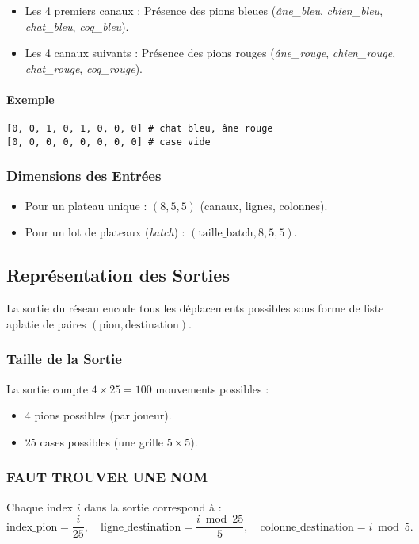 \documentclass[]{article}
\begin{document}
\begin{itemize}
    \item Les 4 premiers canaux : Présence des pions bleues (\textit{âne\_bleu}, \textit{chien\_bleu}, \textit{chat\_bleu}, \textit{coq\_bleu}).
    \item Les 4 canaux suivants : Présence des pions rouges (\textit{âne\_rouge}, \textit{chien\_rouge}, \textit{chat\_rouge}, \textit{coq\_rouge}).
\end{itemize}

\paragraph{Exemple}

\begin{verbatim}
[0, 0, 1, 0, 1, 0, 0, 0] # chat bleu, âne rouge
[0, 0, 0, 0, 0, 0, 0, 0] # case vide
\end{verbatim}

\subsubsection{Dimensions des Entrées}
\begin{itemize}
    \item Pour un plateau unique : \((8, 5, 5)\) (canaux, lignes, colonnes).
    \item Pour un lot de plateaux (\textit{batch}) : \((\text{taille\_batch}, 8, 5, 5)\).
\end{itemize}

\subsection{Représentation des Sorties}
La sortie du réseau encode tous les déplacements possibles sous forme de liste aplatie de paires \((\text{pion}, \text{destination})\).

\subsubsection{Taille de la Sortie}
La sortie compte \(4 \times 25 = 100\) mouvements possibles :
\begin{itemize}
    \item 4 pions possibles (par joueur).
    \item 25 cases possibles (une grille \(5 \times 5\)).
\end{itemize}

\subsubsection{FAUT TROUVER UNE NOM} %
Chaque index \(i\) dans la sortie correspond à :
\[
\text{index\_pion} = \frac{i}{25}, \quad
\text{ligne\_destination} = \frac{i \bmod 25}{5}, \quad
\text{colonne\_destination} = i \bmod 5.
\]
\end{document}
